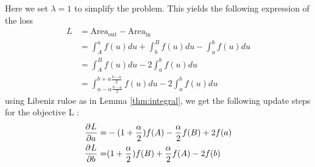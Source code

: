Here we set $\lambda = 1$ to simplify the problem. This yields the following expression of the loss 
\begin{equation}
\begin{aligned} 
L &=  \text{Area}_{\text{out}} - \text{Area}_{\text{in}} \\
&= \int_{A}^{a}f(u)du + \int_{b}^{B}f(u)du - \int_{a}^{b}f(u)du  \\
 &= \int_{A}^{B}f(u)du  - 2\int_{a}^{b}f(u)du \\
 &= \int_{a - \alpha \frac{b-a}{2}}^{b + \alpha \frac{b-a}{2} }f(u)du  - 2\int_{a}^{b}f(u)du\label{eq:oir-b-loss}
\end{aligned}
\end{equation}
using Libeniz ruloe as in Lemma \ref{thm:integral}, we get the following update steps for the objective L :
\begin{equation}
\begin{aligned} 
\frac{\partial^{} L}{\partial a} =& -(1+ \frac{\alpha}{2})f(A) - \frac{\alpha}{2}f(B) + 2f(a) \\
\frac{\partial^{} L}{\partial b} =& (1+ \frac{\alpha}{2})f(B) + \frac{\alpha}{2}f(A) - 2f(b)
\label{eq:update-ioc-1}
\end{aligned}
\end{equation}

